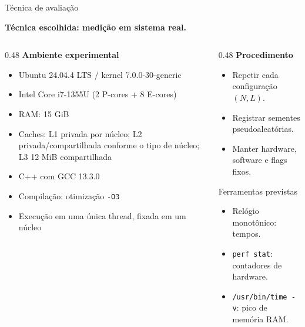 \documentclass[aspectratio=169,11pt]{beamer}
\begin{document}

\begin{frame}{Técnica de avaliação}

    \textbf{Técnica escolhida: medição em sistema real.}

    \vspace{0.08cm}

    \begin{columns}[T,onlytextwidth]

        \begin{column}{0.48\textwidth}
            \textbf{Ambiente experimental}

            \small
            \begin{itemize}
                \item Ubuntu 24.04.4 LTS / kernel 7.0.0-30-generic
                \item Intel Core i7-1355U (2 P-cores + 8 E-cores)
                \item RAM: 15 GiB
                \item Caches: L1 privada por núcleo; L2 privada/compartilhada
          conforme o tipo de núcleo; L3 12 MiB compartilhada
                \item C++ com GCC 13.3.0
                \item Compilação: otimização \texttt{-O3}
                \item Execução em uma única thread, fixada em um núcleo
            \end{itemize}
        \end{column}

        \begin{column}{0.48\textwidth}
            \textbf{Procedimento}

            \small
            \begin{itemize}
                \item Repetir cada configuração $(N,L)$.
                \item Registrar sementes pseudoaleatórias.
                \item Manter hardware, software e flags fixos.
            \end{itemize}

            \vspace{0.25cm}

            \begin{impactbox}{Ferramentas previstas}
                \small
                \begin{itemize}
                    \item Relógio monotônico: tempos.
                    \item \texttt{perf stat}: contadores de hardware.
                    \item \texttt{/usr/bin/time -v}: pico de memória RAM.
                \end{itemize}
            \end{impactbox}
        \end{column}


\end{columns}
\end{frame}
\end{document}
